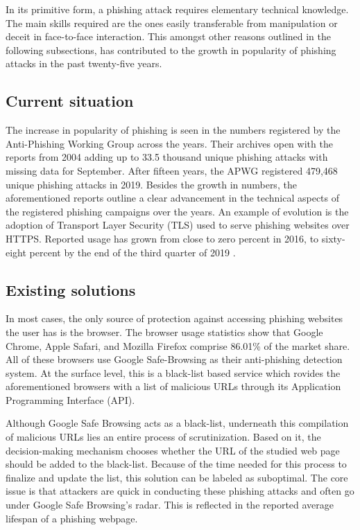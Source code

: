 In its primitive form, a phishing attack requires elementary technical
knowledge. The main skills required are the ones easily transferable from
manipulation or deceit in face-to-face interaction. This amongst other reasons
outlined in the following subsections, has contributed to the growth in
popularity of phishing attacks in the past twenty-five years.

\subsection{Current situation}
The increase in popularity of phishing is seen in the numbers registered by the
Anti-Phishing Working Group \citep{APWG} across the years. Their archives open
with the reports from 2004 adding up to 33.5 thousand unique phishing attacks
with missing data for September. After fifteen years, the APWG registered
479,468 unique phishing attacks in 2019. Besides the growth in numbers, the
aforementioned reports outline a clear advancement in the technical aspects of
the registered phishing campaigns over the years. An example of evolution is the
adoption of Transport Layer Security (TLS) used to serve phishing websites over
HTTPS. Reported usage has grown from close to zero percent in 2016, to
sixty-eight percent by the end of the third quarter of 2019 \citep{APWG_Q42019}.

\subsection{Existing solutions}
In most cases, the only source of protection against accessing phishing websites
the user has is the browser. The browser usage statistics show that Google
Chrome, Apple Safari, and Mozilla Firefox comprise 86.01\% of the market share.
All of these browsers use Google Safe-Browsing as their anti-phishing detection
system. At the surface level, this is a black-list based service which rovides
the aforementioned browsers with a list of malicious URLs through its
Application Programming Interface (API).


Although Google Safe Browsing acts as a black-list, underneath this compilation
of malicious URLs lies an entire process of scrutinization. Based on it, the
decision-making mechanism chooses whether the URL of the studied web page should
be added to the black-list. Because of the time needed for this process to
finalize and update the list, this solution can be labeled as suboptimal. The
core issue is that attackers are quick in conducting these phishing attacks and
often go under Google Safe Browsing's radar. This is reflected in the reported
average lifespan of a phishing webpage.

